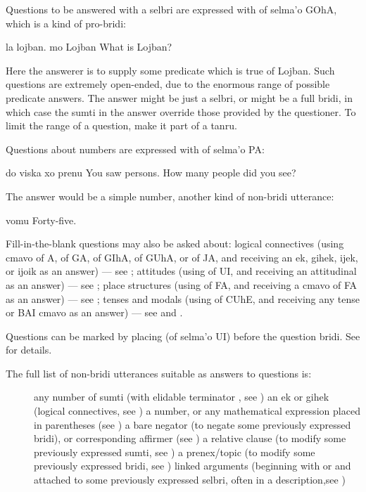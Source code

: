 Questions to be answered with a selbri are expressed with
     of selma'o GOhA, which is a kind of pro-bridi:
\begin{example}
la lojban. mo\n
Lojban \n
What is Lojban?
\end{example}

Here the answerer is to supply some predicate which is true of
    Lojban. Such questions are extremely open-ended, due to the
    enormous range of possible predicate answers. The answer might
    be just a selbri, or might be a full bridi, in which case the
    sumti in the answer override those provided by the questioner.
    To limit the range of a  question, make it part of a
    tanru. 

Questions about numbers are expressed with  of selma'o
    PA:
\begin{example}
do viska xo prenu\n
You saw  persons.\n
How many people did you see?
\end{example}

The answer would be a simple number, another kind of
    non-bridi utterance:
\begin{example}
vomu\n
Forty-five.
\end{example}

Fill-in-the-blank questions may also be asked about: logical
    connectives (using cmavo  of A,  of GA, 
    of GIhA,  of GUhA, or  of JA, and receiving an
    ek, gihek, ijek, or ijoik as an answer) --- see ; attitudes (using  of
    UI, and receiving an attitudinal as an answer) --- see ; place structures (using
     of FA, and receiving a cmavo of FA as an answer) ---
    see ; tenses and modals
    (using  of CUhE, and receiving any tense or BAI cmavo
    as an answer) --- see  and .

Questions can be marked by placing  (of selma'o UI)
    before the question bridi. See  for details.

The full list of non-bridi utterances suitable as answers to
    questions is:
\begin{description}
\item[] any number of sumti (with elidable terminator , see ) an ek or gihek (logical connectives, see ) a number, or any mathematical expression placed in parentheses (see ) a bare  negator (to negate some previously expressed bridi), or corresponding  affirmer (see ) a relative clause (to modify some previously expressed sumti, see ) a prenex/topic (to modify some previously expressed bridi, see ) linked arguments (beginning with  or  and attached to some previously expressed selbri, often in a description,see )

\end{description}

